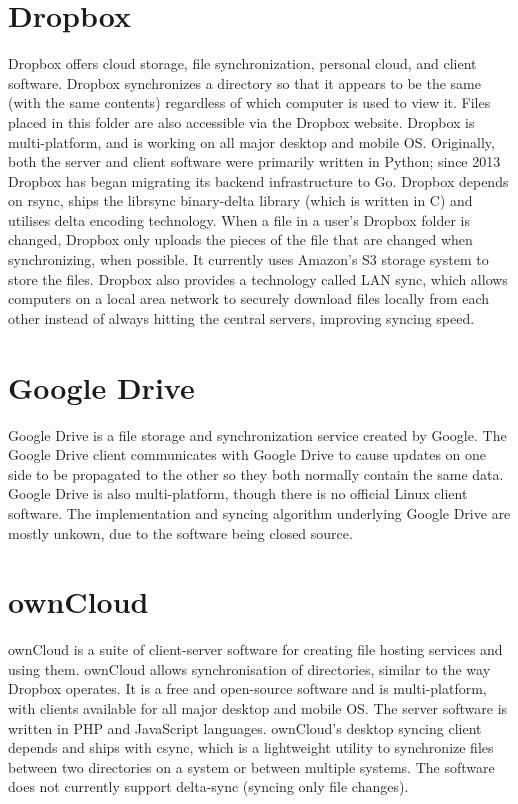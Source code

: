 \section{Dropbox}
  Dropbox offers cloud storage, file synchronization, personal cloud, and client software. Dropbox synchronizes a directory so that it appears to be the same (with the same contents) regardless of which computer is used to view it. Files placed in this folder are also accessible via the Dropbox website. Dropbox is multi-platform, and is working on all major desktop and mobile OS. Originally, both the server and client software were primarily written in Python; since 2013 Dropbox has began migrating its backend infrastructure to Go. Dropbox depends on rsync, ships the librsync binary-delta library (which is written in C) and utilises delta encoding technology. When a file in a user's Dropbox folder is changed, Dropbox only uploads the pieces of the file that are changed when synchronizing, when possible. It currently uses Amazon's S3 storage system to store the files. Dropbox also provides a technology called LAN sync, which allows computers on a local area network to securely download files locally from each other instead of always hitting the central servers, improving syncing speed.

\section{Google Drive}
  Google Drive is a file storage and synchronization service created by Google. The Google Drive client communicates with Google Drive to cause updates on one side to be propagated to the other so they both normally contain the same data. Google Drive is also multi-platform, though there is no official Linux client software. The implementation and syncing algorithm underlying Google Drive are mostly unkown, due to the software being closed source.

\section{ownCloud}
  ownCloud\cite{owncloud} is a suite of client-server software for creating file hosting services and using them. ownCloud allows synchronisation of directories, similar to the way Dropbox operates. It is a free and open-source software and is multi-platform, with clients available for all major desktop and mobile OS. The server software is written in PHP and JavaScript languages. ownCloud's desktop syncing client depends and ships with csync\cite{csync}, which is a lightweight utility to synchronize files between two directories on a system or between multiple systems. The software does not currently support delta-sync (syncing only file changes).


